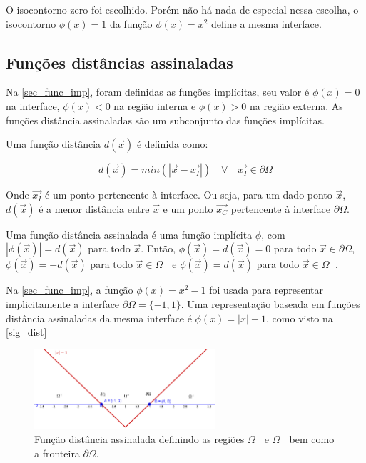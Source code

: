 O isocontorno zero foi escolhido. Porém não há nada de especial nessa escolha, o isocontorno $\phi(x)=1$ da função $\phi(x)=x^2$ define a mesma interface.

\subsection{Funções distâncias assinaladas}

Na \autoref{sec_func_imp}, foram definidas as funções implícitas, seu valor é $\phi(x)=0$ na interface, $\phi(x)<0$ na região interna e $\phi(x)>0$ na região externa. As funções distância assinaladas são um subconjunto das funções implícitas.     

Uma função distância $d(\vec{x})$ é definida como:

\begin{equation}
d(\vec{x})=min(|\vec{x}-\vec{x_I}|) \quad \forall \quad \vec{x_I} \in \partial\Omega
\end{equation}

Onde $\vec{x_I}$ é um ponto pertencente à interface. Ou seja, para um dado ponto $\vec{x}$, $d(\vec{x})$ é a menor distância entre $\vec{x}$ e um ponto $\vec{x_C}$ pertencente à interface $\partial\Omega$.   

Uma função distância assinalada é uma função implícita $\phi$, com $|\phi(\vec{x})|=d(\vec{x})$ para todo $\vec{x}$. Então, $\phi(\vec{x})=d(\vec{x})=0$ para todo $\vec{x} \in \partial\Omega$, $\phi(\vec{x})=-d(\vec{x})$ para todo $\vec{x} \in \Omega^-$ e $\phi(\vec{x})=d(\vec{x})$ para todo $\vec{x} \in \Omega^+$.

Na \autoref{sec_func_imp}, a função $\phi(x)=x^2-1$ foi usada para representar implicitamente a interface $\partial\Omega=\{-1,1\}$. Uma representação baseada em funções distância assinaladas da mesma interface é $\phi(x)=|x|-1$, como visto na \autoref{sig_dist} 

\begin{figure}[!htb]
	\caption{\label{sig_dist}Função distância assinalada definindo as regiões $\Omega^-$ e $\Omega^+$ bem como a fronteira $\partial\Omega$.}
	\begin{center}
		\includegraphics[width=0.6\textwidth]{revisao_bibliografica/signed_dist}
	\end{center}
\end{figure}

